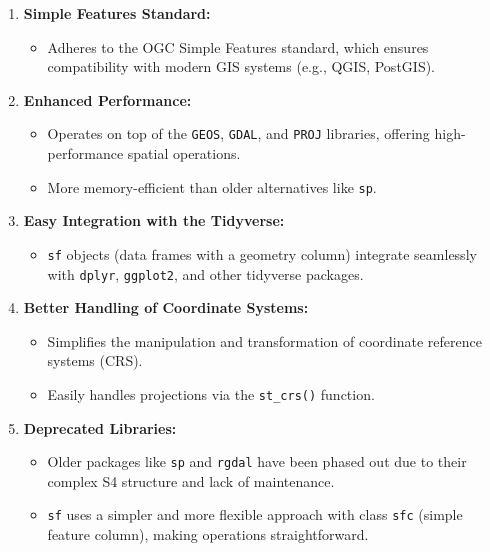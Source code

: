 \documentclass[
]{book}
\providecommand{\tightlist}{%
  \setlength{\itemsep}{0pt}\setlength{\parskip}{0pt}}
\begin{document}
\begin{enumerate}
\def\labelenumi{\arabic{enumi}.}
\tightlist
\item
  \textbf{Simple Features Standard:}

  \begin{itemize}
  \tightlist
  \item
    Adheres to the OGC Simple Features standard, which ensures compatibility with modern GIS systems (e.g., QGIS, PostGIS).
  \end{itemize}
\item
  \textbf{Enhanced Performance:}

  \begin{itemize}
  \tightlist
  \item
    Operates on top of the \texttt{GEOS}, \texttt{GDAL}, and \texttt{PROJ} libraries, offering high-performance spatial operations.\\
  \item
    More memory-efficient than older alternatives like \texttt{sp}.
  \end{itemize}
\item
  \textbf{Easy Integration with the Tidyverse:}

  \begin{itemize}
  \tightlist
  \item
    \texttt{sf} objects (data frames with a geometry column) integrate seamlessly with \texttt{dplyr}, \texttt{ggplot2}, and other tidyverse packages.
  \end{itemize}
\item
  \textbf{Better Handling of Coordinate Systems:}

  \begin{itemize}
  \tightlist
  \item
    Simplifies the manipulation and transformation of coordinate reference systems (CRS).
  \item
    Easily handles projections via the \texttt{st\_crs()} function.
  \end{itemize}
\item
  \textbf{Deprecated Libraries:}

  \begin{itemize}
  \tightlist
  \item
    Older packages like \texttt{sp} and \texttt{rgdal} have been phased out due to their complex S4 structure and lack of maintenance.\\
  \item
    \texttt{sf} uses a simpler and more flexible approach with class \texttt{sfc} (simple feature column), making operations straightforward.
  \end{itemize}
\end{enumerate}
\end{document}
